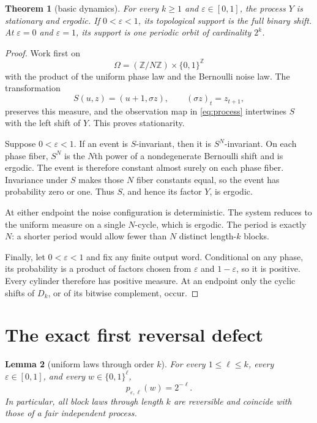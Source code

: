 \documentclass[11pt,a4paper]{amsart}
\newtheorem{theorem}{Theorem}[section]
\newtheorem{lemma}[theorem]{Lemma}
\theoremstyle{definition}
\theoremstyle{remark}
\newcommand{\Z}{\mathbb Z}
\begin{document}
\begin{theorem}[basic dynamics]\label{thm:basic}
For every $k\geq1$ and $\varepsilon\in[0,1]$, the process $Y$ is stationary
and ergodic.  If $0<\varepsilon<1$, its topological support is the full binary
shift.  At $\varepsilon=0$ and $\varepsilon=1$, its support is one periodic
orbit of cardinality $2^k$.
\end{theorem}

\begin{proof}
Work first on
\[
 \Omega=(\Z/N\Z)\times\{0,1\}^{\Z}
\]
with the product of the uniform phase law and the Bernoulli noise law.  The
transformation
\[
 S(u,z)=(u+1,\sigma z),\qquad (\sigma z)_t=z_{t+1},
\]
preserves this measure, and the observation map in \eqref{eq:process}
intertwines $S$ with the left shift of $Y$.  This proves stationarity.

Suppose $0<\varepsilon<1$.  If an event is $S$-invariant, then it is
$S^N$-invariant.  On each phase fiber, $S^N$ is the $N$th power of a
nondegenerate Bernoulli shift and is ergodic.  The event is therefore
constant almost surely on each phase fiber.  Invariance under $S$ makes
those $N$ fiber constants equal, so the event has probability zero or one.
Thus $S$, and hence its factor $Y$, is ergodic.

At either endpoint the noise configuration is deterministic.  The system
reduces to the uniform measure on a single $N$-cycle, which is ergodic.
The period is exactly $N$: a shorter period would allow fewer than $N$
distinct length-$k$ blocks.

Finally, let $0<\varepsilon<1$ and fix any finite output word.  Conditional
on any phase, its probability is a product of factors chosen from
$\varepsilon$ and $1-\varepsilon$, so it is positive.  Every cylinder
therefore has positive measure.  At an endpoint only the cyclic shifts of
$D_k$, or of its bitwise complement, occur.
\end{proof}

\section{The exact first reversal defect}

\begin{lemma}[uniform laws through order $k$]\label{lem:uniform}
For every $1\leq\ell\leq k$, every $\varepsilon\in[0,1]$, and every
$w\in\{0,1\}^{\ell}$,
\[
 p_{\varepsilon,\ell}(w)=2^{-\ell}.
\]
In particular, all block laws through length $k$ are reversible and coincide
with those of a fair independent process.
\end{lemma}
\end{document}
